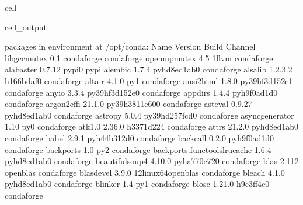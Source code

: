 \documentclass[letterpaper,table,10pt,english]{jupyterBook}
\begin{document}
\begin{sphinxuseclass}{cell}
\begin{sphinxVerbatimOutput}
\begin{sphinxuseclass}{cell_output}
\begin{sphinxVerbatim}[commandchars=\\\{\}]
\PYGZsh{} packages in environment at /opt/conda:
\PYGZsh{}
\PYGZsh{} Name                    Version                   Build  Channel
\PYGZus{}libgcc\PYGZus{}mutex             0.1                 conda\PYGZus{}forge    conda\PYGZhy{}forge
\PYGZus{}openmp\PYGZus{}mutex             4.5                      1\PYGZus{}llvm    conda\PYGZhy{}forge
alabaster                 0.7.12                   pypi\PYGZus{}0    pypi
alembic                   1.7.4              pyhd8ed1ab\PYGZus{}0    conda\PYGZhy{}forge
alsa\PYGZhy{}lib                  1.2.3.2              h166bdaf\PYGZus{}0    conda\PYGZhy{}forge
altair                    4.1.0                      py\PYGZus{}1    conda\PYGZhy{}forge
ansi2html                 1.8.0            py39hf3d152e\PYGZus{}1    conda\PYGZhy{}forge
anyio                     3.3.4            py39hf3d152e\PYGZus{}0    conda\PYGZhy{}forge
appdirs                   1.4.4              pyh9f0ad1d\PYGZus{}0    conda\PYGZhy{}forge
argon2\PYGZhy{}cffi               21.1.0           py39h3811e60\PYGZus{}0    conda\PYGZhy{}forge
asteval                   0.9.27             pyhd8ed1ab\PYGZus{}0    conda\PYGZhy{}forge
astropy                   5.0.4            py39hd257fcd\PYGZus{}0    conda\PYGZhy{}forge
async\PYGZus{}generator           1.10                       py\PYGZus{}0    conda\PYGZhy{}forge
atk\PYGZhy{}1.0                   2.36.0               h3371d22\PYGZus{}4    conda\PYGZhy{}forge
attrs                     21.2.0             pyhd8ed1ab\PYGZus{}0    conda\PYGZhy{}forge
babel                     2.9.1              pyh44b312d\PYGZus{}0    conda\PYGZhy{}forge
backcall                  0.2.0              pyh9f0ad1d\PYGZus{}0    conda\PYGZhy{}forge
backports                 1.0                        py\PYGZus{}2    conda\PYGZhy{}forge
backports.functools\PYGZus{}lru\PYGZus{}cache 1.6.4              pyhd8ed1ab\PYGZus{}0    conda\PYGZhy{}forge
beautifulsoup4            4.10.0             pyha770c72\PYGZus{}0    conda\PYGZhy{}forge
blas                      2.112                  openblas    conda\PYGZhy{}forge
blas\PYGZhy{}devel                3.9.0           12\PYGZus{}linux64\PYGZus{}openblas    conda\PYGZhy{}forge
bleach                    4.1.0              pyhd8ed1ab\PYGZus{}0    conda\PYGZhy{}forge
blinker                   1.4                        py\PYGZus{}1    conda\PYGZhy{}forge
blosc                     1.21.0               h9c3ff4c\PYGZus{}0    conda\PYGZhy{}forge

\end{sphinxVerbatim}
\end{sphinxuseclass}
\end{sphinxVerbatimOutput}
\end{sphinxuseclass}
\end{document}
